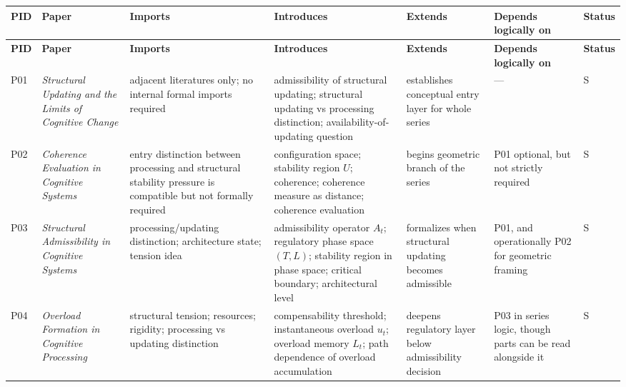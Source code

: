 \documentclass[11pt,a4paper]{article}
\begin{document}
	\begin{longtable}{>{\RaggedRight\arraybackslash}p{}
			>{\RaggedRight\arraybackslash}p{}
			>{\RaggedRight\arraybackslash}p{}
			>{\RaggedRight\arraybackslash}p{}
			>{\RaggedRight\arraybackslash}p{}
			>{\RaggedRight\arraybackslash}p{}
			>{\RaggedRight\arraybackslash}p{}}
		\toprule
		\textbf{PID} & \textbf{Paper} & \textbf{Imports} & \textbf{Introduces} & \textbf{Extends} & \textbf{Depends logically on} & \textbf{Status} \\
		\midrule
		\endfirsthead
		\toprule
		\textbf{PID} & \textbf{Paper} & \textbf{Imports} & \textbf{Introduces} & \textbf{Extends} & \textbf{Depends logically on} & \textbf{Status} \\
		\midrule
		\endhead
		
		P01 & \emph{Structural Updating and the Limits of Cognitive Change} &
		adjacent literatures only; no internal formal imports required &
		admissibility of structural updating; structural updating vs processing distinction; availability-of-updating question &
		establishes conceptual entry layer for whole series &
		--- &
		S \\
		
		P02 & \emph{Coherence Evaluation in Cognitive Systems} &
		entry distinction between processing and structural stability pressure is compatible but not formally required &
		configuration space; stability region $U$; coherence; coherence measure as distance; coherence evaluation &
		begins geometric branch of the series &
		P01 optional, but not strictly required &
		S \\
		
		P03 & \emph{Structural Admissibility in Cognitive Systems} &
		processing/updating distinction; architecture state; tension idea &
		admissibility operator $A_t$; regulatory phase space $(T,L)$; stability region in phase space; critical boundary; architectural level &
		formalizes when structural updating becomes admissible &
		P01, and operationally P02 for geometric framing &
		S \\
		
		P04 & \emph{Overload Formation in Cognitive Processing} &
		structural tension; resources; rigidity; processing vs updating distinction &
		compensability threshold; instantaneous overload $u_t$; overload memory $L_t$; path dependence of overload accumulation &
		deepens regulatory layer below admissibility decision &
		P03 in series logic, though parts can be read alongside it &
		S \\
		

\end{longtable}
\end{document}

